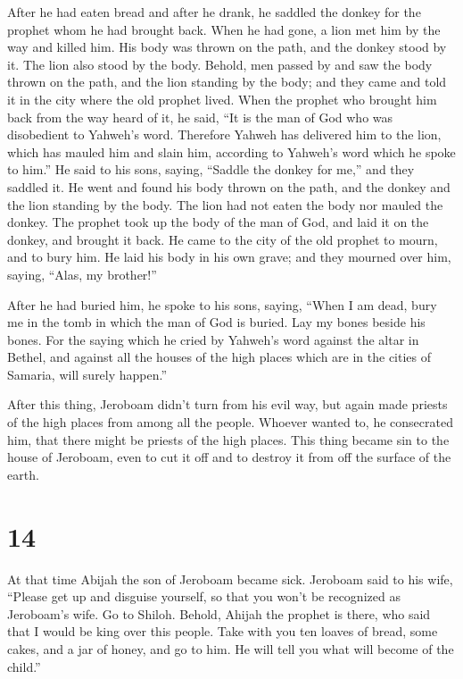  After he had eaten bread and after he drank, he saddled
the donkey for the prophet whom he had brought back. 
When he had gone, a lion met him by the way and killed him. His body was
thrown on the path, and the donkey stood by it. The lion also stood by
the body.  Behold, men passed by and saw the body thrown
on the path, and the lion standing by the body; and they came and told
it in the city where the old prophet lived.  When the
prophet who brought him back from the way heard of it, he said, ``It is
the man of God who was disobedient to Yahweh's word. Therefore Yahweh
has delivered him to the lion, which has mauled him and slain him,
according to Yahweh's word which he spoke to him.''  He
said to his sons, saying, ``Saddle the donkey for me,'' and they saddled
it.  He went and found his body thrown on the path, and
the donkey and the lion standing by the body. The lion had not eaten the
body nor mauled the donkey.  The prophet took up the body
of the man of God, and laid it on the donkey, and brought it back. He
came to the city of the old prophet to mourn, and to bury him.
 He laid his body in his own grave; and they mourned over
him, saying, ``Alas, my brother!''

 After he had buried him, he spoke to his sons, saying,
``When I am dead, bury me in the tomb in which the man of God is buried.
Lay my bones beside his bones.  For the saying which he
cried by Yahweh's word against the altar in Bethel, and against all the
houses of the high places which are in the cities of Samaria, will
surely happen.''

 After this thing, Jeroboam didn't turn from his evil
way, but again made priests of the high places from among all the
people. Whoever wanted to, he consecrated him, that there might be
priests of the high places.  This thing became sin to the
house of Jeroboam, even to cut it off and to destroy it from off the
surface of the earth.

\hypertarget{section-13}{%
\section{14}\label{section-13}}

 At that time Abijah the son of Jeroboam became sick.
 Jeroboam said to his wife, ``Please get up and disguise
yourself, so that you won't be recognized as Jeroboam's wife. Go to
Shiloh. Behold, Ahijah the prophet is there, who said that I would be
king over this people.  Take with you ten loaves of bread,
some cakes, and a jar of honey, and go to him. He will tell you what
will become of the child.''

